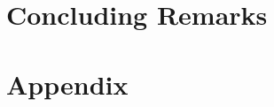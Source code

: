 \documentclass[runningheads, 10pt]{llncs}
\begin{document}
\section{Concluding Remarks}\label{sec:conc}
\vspace{-0.2cm}

%
%


%
%
\clearpage
\appendix
\section*{Appendix}\label{sec:appendix}

%
%
\end{document}
